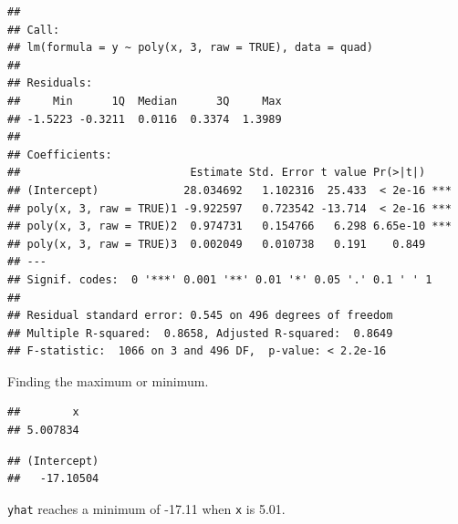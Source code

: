 \documentclass[]{book}
\newenvironment{Shaded}{\begin{snugshade}}{\end{snugshade}}
\newcommand{\DecValTok}[1]{\textcolor[rgb]{0.00,0.00,0.81}{#1}}
\newcommand{\FloatTok}[1]{\textcolor[rgb]{0.00,0.00,0.81}{#1}}
\newcommand{\CommentTok}[1]{\textcolor[rgb]{0.56,0.35,0.01}{\textit{#1}}}
\newcommand{\OperatorTok}[1]{\textcolor[rgb]{0.81,0.36,0.00}{\textbf{#1}}}
\newcommand{\NormalTok}[1]{#1}
\theoremstyle{definition}
\theoremstyle{definition}
\theoremstyle{definition}
\theoremstyle{remark}
\begin{document}
\begin{verbatim}
## 
## Call:
## lm(formula = y ~ poly(x, 3, raw = TRUE), data = quad)
## 
## Residuals:
##     Min      1Q  Median      3Q     Max 
## -1.5223 -0.3211  0.0116  0.3374  1.3989 
## 
## Coefficients:
##                          Estimate Std. Error t value Pr(>|t|)    
## (Intercept)             28.034692   1.102316  25.433  < 2e-16 ***
## poly(x, 3, raw = TRUE)1 -9.922597   0.723542 -13.714  < 2e-16 ***
## poly(x, 3, raw = TRUE)2  0.974731   0.154766   6.298 6.65e-10 ***
## poly(x, 3, raw = TRUE)3  0.002049   0.010738   0.191    0.849    
## ---
## Signif. codes:  0 '***' 0.001 '**' 0.01 '*' 0.05 '.' 0.1 ' ' 1
## 
## Residual standard error: 0.545 on 496 degrees of freedom
## Multiple R-squared:  0.8658, Adjusted R-squared:  0.8649 
## F-statistic:  1066 on 3 and 496 DF,  p-value: < 2.2e-16
\end{verbatim}

Finding the maximum or minimum.

\begin{Shaded}
\end{Shaded}

\begin{verbatim}
##        x 
## 5.007834
\end{verbatim}

\begin{Shaded}
\end{Shaded}

\begin{verbatim}
## (Intercept) 
##   -17.10504
\end{verbatim}

\texttt{yhat} reaches a minimum of -17.11 when \texttt{x} is 5.01.
\end{document}

